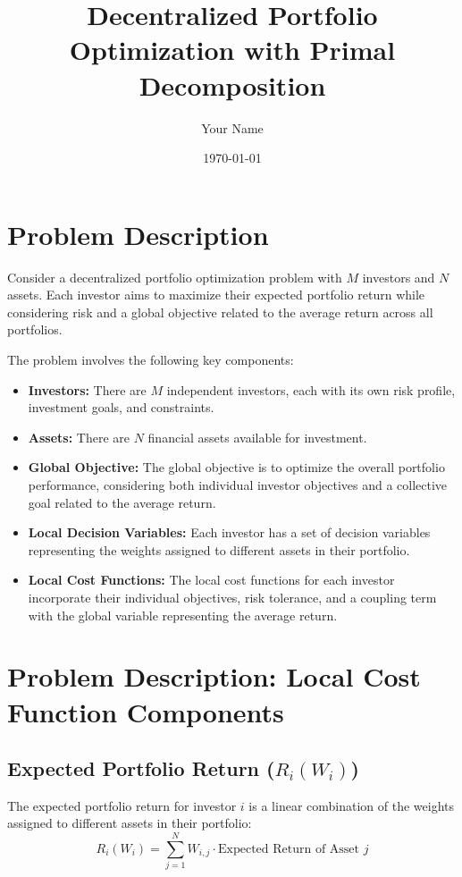 \documentclass{article}
\begin{document}
	
	\title{Decentralized Portfolio Optimization with Primal Decomposition}
	\author{Your Name}
	\date{\today}
	\maketitle
	
	\section*{Problem Description}
	
	Consider a decentralized portfolio optimization problem with $M$ investors and $N$ assets. Each investor aims to maximize their expected portfolio return while considering risk and a global objective related to the average return across all portfolios.
	
	The problem involves the following key components:
	
	\begin{itemize}
		\item \textbf{Investors:} There are $M$ independent investors, each with its own risk profile, investment goals, and constraints.
		\item \textbf{Assets:} There are $N$ financial assets available for investment.
		\item \textbf{Global Objective:} The global objective is to optimize the overall portfolio performance, considering both individual investor objectives and a collective goal related to the average return.
		\item \textbf{Local Decision Variables:} Each investor has a set of decision variables representing the weights assigned to different assets in their portfolio.
		\item \textbf{Local Cost Functions:} The local cost functions for each investor incorporate their individual objectives, risk tolerance, and a coupling term with the global variable representing the average return.
	\end{itemize}
	
	\section*{Problem Description: Local Cost Function Components}
	
	\subsection*{Expected Portfolio Return ($R_i(W_i)$)}
	The expected portfolio return for investor $i$ is a linear combination of the weights assigned to different assets in their portfolio:
	\[ R_i(W_i) = \sum_{j=1}^{N} W_{i,j} \cdot \text{Expected Return of Asset } j \]
	
\end{document}
